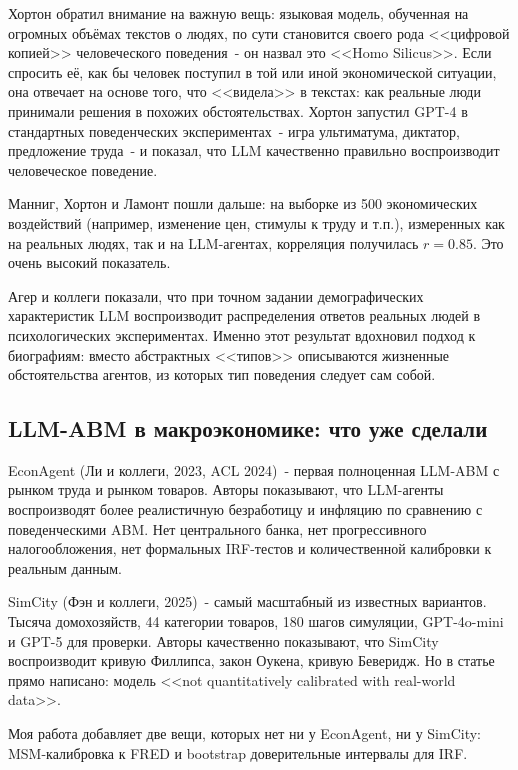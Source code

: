 \documentclass[12pt, a4paper]{article}
\begin{document}
Хортон \cite{horton2023} обратил внимание на важную вещь: языковая модель, обученная на огромных объёмах текстов о людях, по сути становится своего рода <<цифровой копией>> человеческого поведения~- он назвал это <<Homo Silicus>>. Если спросить её, как бы человек поступил в той или иной экономической ситуации, она отвечает на основе того, что <<видела>> в текстах: как реальные люди принимали решения в похожих обстоятельствах. Хортон запустил GPT-4 в стандартных поведенческих экспериментах~- игра ультиматума, диктатор, предложение труда~- и показал, что LLM качественно правильно воспроизводит человеческое поведение.

Манниг, Хортон и Ламонт \cite{manning2024} пошли дальше: на выборке из 500 экономических воздействий (например, изменение цен, стимулы к труду и т.п.), измеренных как на реальных людях, так и на LLM-агентах, корреляция получилась $r = 0.85$. Это очень высокий показатель.

Агер и коллеги \cite{aher2023} показали, что при точном задании демографических характеристик LLM воспроизводит распределения ответов реальных людей в психологических экспериментах. Именно этот результат вдохновил подход к биографиям: вместо абстрактных <<типов>> описываются жизненные обстоятельства агентов, из которых тип поведения следует сам собой.

\subsection{LLM-ABM в макроэкономике: что уже сделали}

EconAgent \cite{li2023} (Ли и коллеги, 2023, ACL 2024)~- первая полноценная LLM-ABM с рынком труда и рынком товаров. Авторы показывают, что LLM-агенты воспроизводят более реалистичную безработицу и инфляцию по сравнению с поведенческими ABM. Нет центрального банка, нет прогрессивного налогообложения, нет формальных IRF-тестов и количественной калибровки к реальным данным.

SimCity \cite{feng2025} (Фэн и коллеги, 2025)~- самый масштабный из известных вариантов. Тысяча домохозяйств, 44 категории товаров, 180 шагов симуляции, GPT-4o-mini и GPT-5 для проверки. Авторы качественно показывают, что SimCity воспроизводит кривую Филлипса, закон Оукена, кривую Беверидж. Но в статье прямо написано: модель <<not quantitatively calibrated with real-world data>>.

Моя работа добавляет две вещи, которых нет ни у EconAgent, ни у SimCity: MSM-калибровка к FRED и bootstrap доверительные интервалы для IRF.
\end{document}

